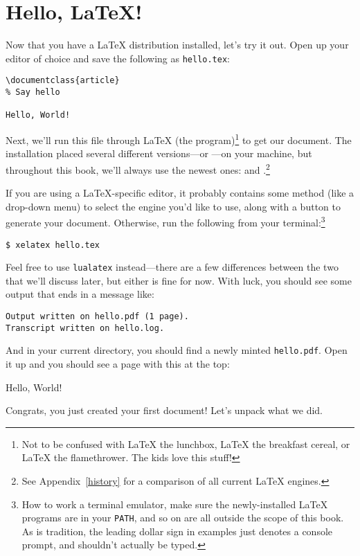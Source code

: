 \chapter{Hello, \texorpdfstring{\LaTeX}{LaTeX}!}
\label{hello}

Now that you have a \LaTeX{} distribution installed,
let's try it out.
Open up your editor of choice and save the following as \texttt{hello.tex}:
\begin{leftfigure}
\begin{lstlisting}
\documentclass{article}
% Say hello

Hello, World!

\end{lstlisting}
\end{leftfigure}
Next, we'll run this file through \LaTeX{} (the program)\footnote{Not to be
confused with \LaTeX{} the lunchbox, \LaTeX{} the breakfast cereal,
or \LaTeX{} the flamethrower. The kids love this stuff!}
to get our document.
The installation placed several different versions---or
---on your machine,
but throughout this book, we'll always use the newest ones:
\LuaLaTeX{} and \XeLaTeX.\punckern\footnote{See Appendix~\ref{history} for a
comparison of all current \LaTeX{} engines.}

If you are using a \LaTeX{}-specific editor, it probably contains some method
(like a drop-down menu) to select the engine you'd like to use,
along with a button to generate your document.
Otherwise, run the following from your terminal:\footnote{%
How to work a terminal emulator,
make sure the newly-installed \LaTeX{} programs are in your \texttt{PATH},
and so on are all outside the scope of this book.
As is tradition, the leading dollar sign in examples just denotes a console
prompt, and shouldn't actually be typed.}
\begin{leftfigure}
\begin{lstlisting}
$ xelatex hello.tex
\end{lstlisting}
\end{leftfigure}
Feel free to use \texttt{lualatex} instead---there are a few differences
between the two that we'll discuss later, but either is fine for now.
With luck, you should see some output that ends in a message like:
\begin{leftfigure}
\begin{lstlisting}
Output written on hello.pdf (1 page).
Transcript written on hello.log.
\end{lstlisting}
\end{leftfigure}
And in your current directory, you should find a newly minted \texttt{hello.pdf}.
Open it up and you should see a page with this at the top:
\begin{leftfigure}
\lm Hello, World!
\end{leftfigure}
Congrats,
you just created your first document!
Let's unpack what we did.

